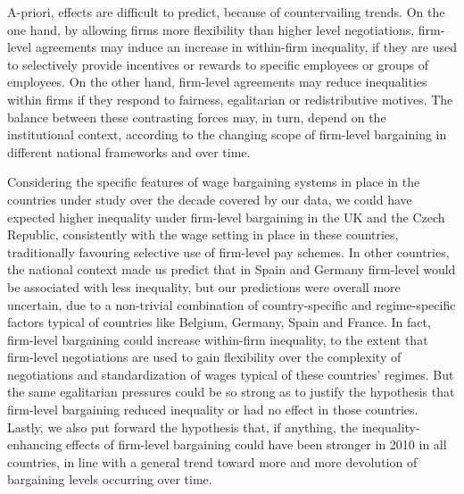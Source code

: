 \documentclass[12pt]{article}
\begin{document}
A-priori, effects are difficult to predict, because of countervailing trends. On the one hand, by allowing firms more flexibility than higher level negotiations, firm-level agreements may induce an increase in within-firm inequality, if they are used to selectively provide incentives or rewards to specific employees or groups of employees. On the other hand, firm-level agreements may reduce inequalities within firms if they respond to fairness, egalitarian or redistributive motives. The balance between these contrasting forces may, in turn, depend on the institutional context, according to the changing scope of firm-level bargaining in different national frameworks and over time.

Considering the specific features of wage bargaining systems in place in the countries under study over the decade covered by our data, we could have expected higher inequality under firm-level bargaining in the UK and the Czech Republic, consistently with the wage setting in place in these countries, traditionally favouring selective use of firm-level pay schemes. In other countries, the national context made us predict that in Spain and Germany firm-level would be associated with less inequality, but our predictions were overall more uncertain, due to a non-trivial combination of country-specific and regime-specific factors typical of countries like Belgium, Germany, Spain and France. In fact, firm-level bargaining could increase within-firm inequality, to the extent that firm-level negotiations are used to gain flexibility over the complexity of negotiations and standardization of wages typical of these countries' regimes. But the same egalitarian pressures could be so strong as to justify the hypothesis that firm-level bargaining reduced inequality or had no effect in those countries. Lastly, we also put forward the hypothesis that, if anything, the inequality-enhancing effects of firm-level bargaining could have been stronger in 2010 in all countries, in line with a general trend toward more and more devolution of bargaining levels occurring over time.
\end{document}
